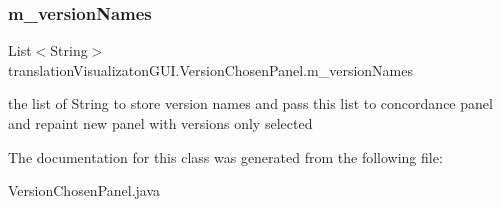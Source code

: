 \subsubsection{\texorpdfstring{m\+\_\+version\+Names}{m\_versionNames}}
{\footnotesize\ttfamily List$<$String$>$ translation\+Visualizaton\+G\+U\+I.\+Version\+Chosen\+Panel.\+m\+\_\+version\+Names}

the list of String to store version names and pass this list to concordance panel and repaint new panel with versions only selected 

The documentation for this class was generated from the following file\+:\begin{DoxyCompactItemize}
\item 
Version\+Chosen\+Panel.\+java\end{DoxyCompactItemize}
